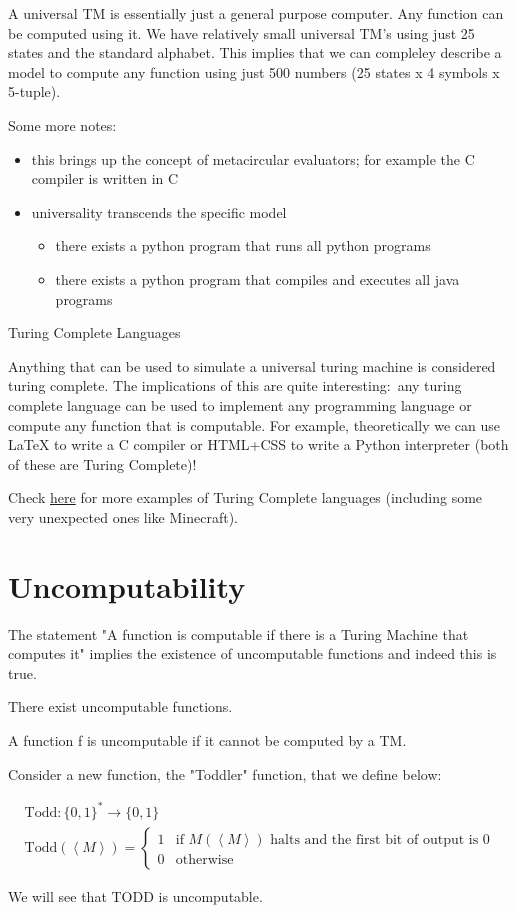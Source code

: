 A universal TM is essentially just a general purpose computer. Any function can be computed using it. We have relatively small universal TM's using just 25 states and the standard alphabet. This implies that we can compleley describe a model to compute any function using just 500 numbers (25 states x 4 symbols x 5-tuple).

Some more notes:
\begin{itemize}
    \item this brings up the concept of metacircular evaluators; for example the C compiler is written in C 
    \item universality transcends the specific model  
    \begin{itemize}
        \item there exists a python program that runs all python programs
        \item there exists a python program that compiles and executes all java programs
    \end{itemize}
\end{itemize}

\begin{definition}
    Turing Complete Languages

    Anything that can be used to simulate a universal turing machine is considered turing complete. The implications of this are quite interesting$:$ any turing complete language can be used to implement any programming language or compute any function that is computable. For example, theoretically we can use \LaTeX{} to write a C compiler or HTML+CSS to write a Python interpreter (both of these are Turing Complete)! 
    
    Check \href{https://en.wikipedia.org/wiki/Turing_completeness#Examples}{here} for more examples of Turing Complete languages (including some very unexpected ones like Minecraft).
\end{definition}

\section{Uncomputability}
The statement "A function is computable if there is a Turing Machine that computes it" implies the existence of uncomputable functions and indeed this is true.

\begin{theorem}
    There exist uncomputable functions.
    
    A function f is uncomputable if it cannot be computed by a TM.
\end{theorem}

Consider a new function, the "Toddler" function, that we define below:

\begin{gather*}
    \text{Todd}: \{0, 1\}^* \rightarrow \{0, 1\} \\
    \text{Todd}(\left<M\right>) = \begin{cases}
        1 & \text{if $M(\left<M\right>)$ halts and the first bit of output is 0} \\
        0 & \text{otherwise}
    \end{cases}
\end{gather*}

We will see that TODD is uncomputable.
